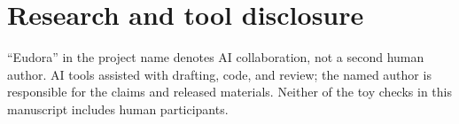 \documentclass[11pt]{article}
\begin{document}
\section*{Research and tool disclosure}

``Eudora'' in the project name denotes AI collaboration, not a second human
author. AI tools assisted with drafting, code, and review; the named author is
responsible for the claims and released materials. Neither of the toy checks
in this manuscript includes human participants.




\end{document}
